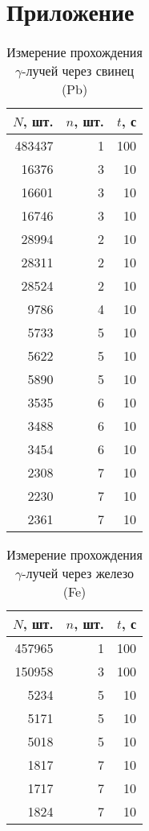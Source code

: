 
\section*{Приложение}




\begin{table}[h]
    \centering
    \caption{Измерение прохождения $\gamma$-лучей через свинец (Pb)}
\begin{tabular}{rrr}
\toprule
 $N$, шт. &  $n$, шт. &  $t$, с \\
\midrule
     483437 &           1 &       100 \\
      16376 &           3 &        10 \\
      16601 &           3 &        10 \\
      16746 &           3 &        10 \\
      28994 &           2 &        10 \\
      28311 &           2 &        10 \\
      28524 &           2 &        10 \\
       9786 &           4 &        10 \\
       5733 &           5 &        10 \\
       5622 &           5 &        10 \\
       5890 &           5 &        10 \\
       3535 &           6 &        10 \\
       3488 &           6 &        10 \\
       3454 &           6 &        10 \\
       2308 &           7 &        10 \\
       2230 &           7 &        10 \\
       2361 &           7 &        10 \\
\bottomrule
\end{tabular}
\end{table}


\begin{table}[h]
    \centering
    \caption{Измерение прохождения $\gamma$-лучей через железо (Fe)}
\begin{tabular}{rrr}
\toprule
 $N$, шт. &  $n$, шт. &  $t$, с \\
\midrule
     457965 &           1 &       100 \\
     150958 &           3 &       100 \\
       5234 &           5 &        10 \\
       5171 &           5 &        10 \\
       5018 &           5 &        10 \\
       1817 &           7 &        10 \\
       1717 &           7 &        10 \\
       1824 &           7 &        10 \\
\bottomrule
\end{tabular}
\end{table}



